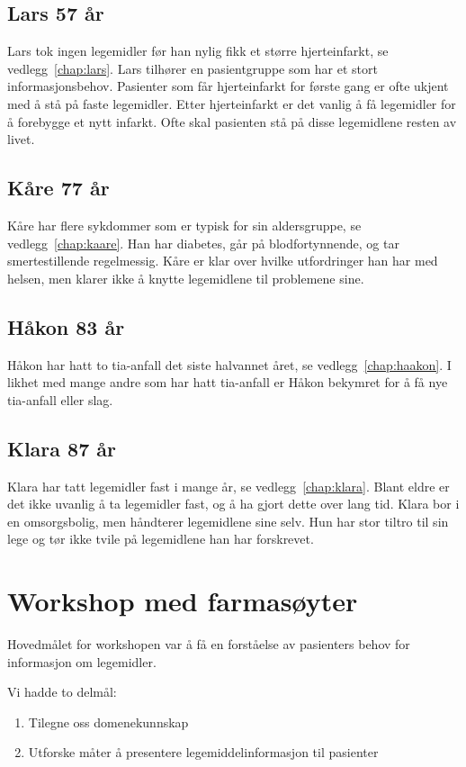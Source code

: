 \subsection{Lars 57 år}
Lars tok ingen legemidler før han nylig fikk et større hjerteinfarkt, se vedlegg~\ref{chap:lars}. Lars tilhører en pasientgruppe som har et stort informasjonsbehov. Pasienter som får hjerteinfarkt for første gang er ofte ukjent med å stå på faste legemidler. Etter hjerteinfarkt er det vanlig å få legemidler for å forebygge et nytt infarkt. Ofte skal pasienten stå på disse legemidlene resten av livet.

\subsection{Kåre 77 år}
Kåre har flere sykdommer som er typisk for sin aldersgruppe, se vedlegg~\ref{chap:kaare}. Han har diabetes, går på blodfortynnende, og tar smertestillende regelmessig. Kåre er klar over hvilke utfordringer han har med helsen, men klarer ikke å knytte legemidlene til problemene sine.

\subsection{Håkon 83 år}
Håkon har hatt to \acrshort{tia}-anfall det siste halvannet året, se vedlegg~\ref{chap:haakon}. I likhet med mange andre som har hatt \acrshort{tia}-anfall er Håkon bekymret for å få nye \acrshort{tia}-anfall eller slag.

\subsection{Klara 87 år}
Klara har tatt legemidler fast i mange år, se vedlegg~\ref{chap:klara}. Blant eldre er det ikke uvanlig å ta legemidler fast, og å ha gjort dette over lang tid. Klara bor i en omsorgsbolig, men håndterer legemidlene sine selv. Hun har stor tiltro til sin lege og tør ikke tvile på legemidlene han har forskrevet.  

\section{Workshop med farmasøyter} \label{sec:workshopFarm}
Hovedmålet for workshopen var å få en forståelse av pasienters behov for informasjon om legemidler. 

Vi hadde to delmål:
\begin{enumerate}
\item Tilegne oss domenekunnskap
\item Utforske måter å presentere legemiddelinformasjon til pasienter
\end{enumerate}


